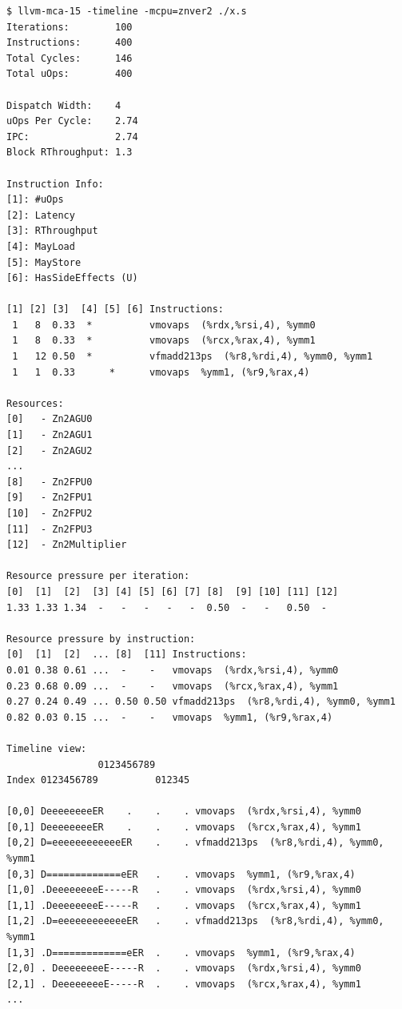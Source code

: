 \documentclass[logo,bsc,singlespacing,parskip]{infthesis}
\begin{document}
\begin{verbatim}
$ llvm-mca-15 -timeline -mcpu=znver2 ./x.s 
Iterations:        100
Instructions:      400
Total Cycles:      146
Total uOps:        400

Dispatch Width:    4
uOps Per Cycle:    2.74
IPC:               2.74
Block RThroughput: 1.3

Instruction Info:
[1]: #uOps
[2]: Latency
[3]: RThroughput
[4]: MayLoad
[5]: MayStore
[6]: HasSideEffects (U)

[1] [2] [3]  [4] [5] [6] Instructions:
 1   8  0.33  *          vmovaps  (%rdx,%rsi,4), %ymm0
 1   8  0.33  *          vmovaps  (%rcx,%rax,4), %ymm1
 1   12 0.50  *          vfmadd213ps  (%r8,%rdi,4), %ymm0, %ymm1
 1   1  0.33      *      vmovaps  %ymm1, (%r9,%rax,4)

Resources:
[0]   - Zn2AGU0
[1]   - Zn2AGU1
[2]   - Zn2AGU2
...
[8]   - Zn2FPU0
[9]   - Zn2FPU1
[10]  - Zn2FPU2
[11]  - Zn2FPU3
[12]  - Zn2Multiplier

Resource pressure per iteration:
[0]  [1]  [2]  [3] [4] [5] [6] [7] [8]  [9] [10] [11] [12]   
1.33 1.33 1.34  -   -   -   -   -  0.50  -   -   0.50  -     

Resource pressure by instruction:
[0]  [1]  [2]  ... [8]  [11] Instructions:
0.01 0.38 0.61 ...  -    -   vmovaps  (%rdx,%rsi,4), %ymm0
0.23 0.68 0.09 ...  -    -   vmovaps  (%rcx,%rax,4), %ymm1
0.27 0.24 0.49 ... 0.50 0.50 vfmadd213ps  (%r8,%rdi,4), %ymm0, %ymm1
0.82 0.03 0.15 ...  -    -   vmovaps  %ymm1, (%r9,%rax,4)

Timeline view:
                0123456789      
Index 0123456789          012345

[0,0] DeeeeeeeeER    .    .    . vmovaps  (%rdx,%rsi,4), %ymm0
[0,1] DeeeeeeeeER    .    .    . vmovaps  (%rcx,%rax,4), %ymm1
[0,2] D=eeeeeeeeeeeeER    .    . vfmadd213ps  (%r8,%rdi,4), %ymm0, %ymm1
[0,3] D=============eER   .    . vmovaps  %ymm1, (%r9,%rax,4)
[1,0] .DeeeeeeeeE-----R   .    . vmovaps  (%rdx,%rsi,4), %ymm0
[1,1] .DeeeeeeeeE-----R   .    . vmovaps  (%rcx,%rax,4), %ymm1
[1,2] .D=eeeeeeeeeeeeER   .    . vfmadd213ps  (%r8,%rdi,4), %ymm0, %ymm1
[1,3] .D=============eER  .    . vmovaps  %ymm1, (%r9,%rax,4)
[2,0] . DeeeeeeeeE-----R  .    . vmovaps  (%rdx,%rsi,4), %ymm0
[2,1] . DeeeeeeeeE-----R  .    . vmovaps  (%rcx,%rax,4), %ymm1
...

\end{verbatim}
\end{document}
